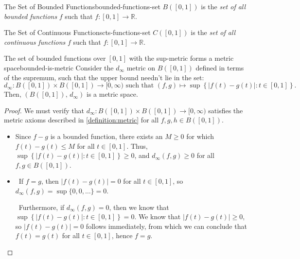 \documentclass{article}
\newcommand*\iffforward{\par\boxed\Longrightarrow\ }
\newcommand*\iffbackward{\par\boxed\Longleftarrow\ }
\numberwithin{equation}{section}
\numberwithin{figure}{section}
\begin{document}
\begin{definition}{The Set of Bounded Functions}{bounded-functions-set}
    $ B([0,1]) $ is the \emph{set of all bounded functions} $ f $ such that
    $ f \colon [0, 1] \to \mathbb{R} $.
\end{definition}
\begin{definition}{The Set of Continuous Functions}{cts-functions-set}
    $ C([0,1]) $ is the \emph{set of all continuous functions} $ f $ such that
    $ f \colon [0, 1] \to \mathbb{R} $.
\end{definition}
\begin{theorem}{The set of bounded functions\texorpdfstring{ over $[0, 1]$}{}
    with the sup-metric forms a metric space}{bounded-is-metric}
    Consider the $ d_\infty $ metric on $ B([0, 1]) $ defined in terms of the
    supremum, such that the upper bound needn't lie in the set:
    \begin{equation}
        d_\infty \colon B([0, 1]) \times B([0, 1]) \to [0, \infty)
            \text{ such that } (f, g) \mapsto \sup\left\{\vert f(t) - g(t) \vert
            \colon t \in [0, 1] \right\}.
    \end{equation}
    Then, $ \left(B([0, 1]),\, d_\infty\right) $ is a metric space.
    \begin{proof}
        We must verify that $ d_\infty : B([0, 1]) \times B([0, 1]) \to [0,
        \infty) $ satisfies the metric axioms described in
        \cref{definition:metric} for all $ f, g, h \in B([0, 1]) $.
        \begin{itemize}
            \item Since $ f-g $ is a bounded function, there exists an $ M \geq
                0 $ for which $ f(t) - g(t) \leq M $ for all $ t \in [0, 1] $.
                Thus, $ \sup\left\{\vert f(t) - g(t) \vert \colon t \in [0,
                1]\right\} \geq 0 $, and $ d_\infty(f, g) \geq 0 $ for all $ f,
                g \in B([0, 1]) $.
            \item \iffforward If $ f = g $, then $ \vert f(t) - g(t) \vert = 0 $
                for all $ t \in [0, 1] $, so $ d_\infty(f, g) = \sup\{0, 0,
                \ldots\} = 0 $.

                \iffbackward Furthermore, if $ d_\infty(f, g) = 0 $, then we
                know that $ \sup\left\{ \vert f(t) - g(t) \vert \colon t \in [0,
                1] \right\} = 0 $. We know that $ \vert f(t) - g(t) \vert \geq 0
                $, so $ \vert f(t) - g(t) \vert = 0 $ follows immediately, from
                which we can conclude that $ f(t) = g(t) $ for all $ t \in [0,
                1] $, hence $ f = g $.


\end{itemize}
\end{proof}
\end{theorem}
\end{document}
